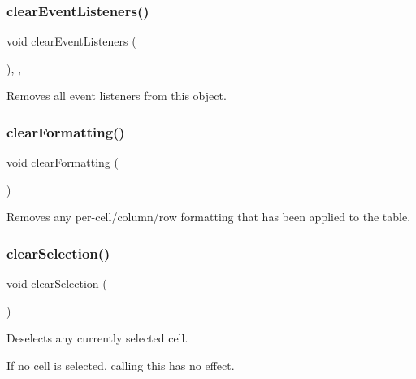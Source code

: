 \subsubsection{\texorpdfstring{clear\+Event\+Listeners()}{clearEventListeners()}}
{\footnotesize\ttfamily void clear\+Event\+Listeners (\begin{DoxyParamCaption}{ }\end{DoxyParamCaption})\hspace{0.3cm}{\ttfamily [protected]}, {\ttfamily [virtual]}, {\ttfamily [inherited]}}



Removes all event listeners from this object. 

\mbox{\label{classGTable_a07ea41be0cdc43ffcd09898d3ae5c523}} 
\subsubsection{\texorpdfstring{clear\+Formatting()}{clearFormatting()}}
{\footnotesize\ttfamily void clear\+Formatting (\begin{DoxyParamCaption}{ }\end{DoxyParamCaption})\hspace{0.3cm}{\ttfamily [virtual]}}



Removes any per-\/cell/column/row formatting that has been applied to the table. 

\mbox{\label{classGTable_abd07e172ccec6823a88289c21124a367}} 
\subsubsection{\texorpdfstring{clear\+Selection()}{clearSelection()}}
{\footnotesize\ttfamily void clear\+Selection (\begin{DoxyParamCaption}{ }\end{DoxyParamCaption})\hspace{0.3cm}{\ttfamily [virtual]}}



Deselects any currently selected cell. 

If no cell is selected, calling this has no effect. \mbox{\label{classGObservable_a284f31528c0520f8e545c03ac9eeac74}} 
